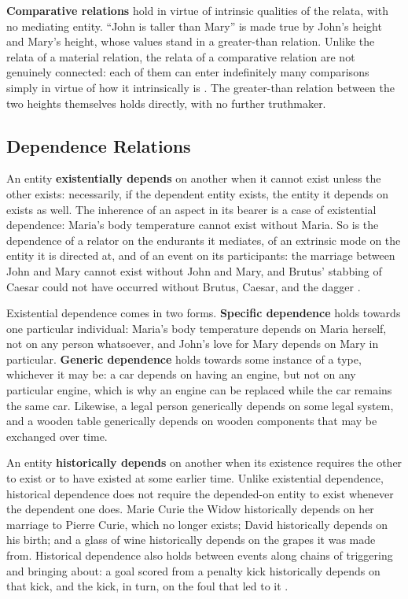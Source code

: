 \textbf{Comparative relations} hold in virtue of intrinsic qualities of the relata, with no mediating entity. ``John is taller than Mary'' is made true by John's height and Mary's height, whose values stand in a greater-than relation. Unlike the relata of a material relation, the relata of a comparative relation are not genuinely connected: each of them can enter indefinitely many comparisons simply in virtue of how it intrinsically is \cite{relations_in_ontology_driven_conceptual_modeling_2019}. The greater-than relation between the two heights themselves holds directly, with no further truthmaker.

\subsection{Dependence Relations}

An entity \textbf{existentially depends} on another when it cannot exist unless the other exists: necessarily, if the dependent entity exists, the entity it depends on exists as well. The inherence of an aspect in its bearer is a case of existential dependence: Maria's body temperature cannot exist without Maria. So is the dependence of a relator on the endurants it mediates, of an extrinsic mode on the entity it is directed at, and of an event on its participants: the marriage between John and Mary cannot exist without John and Mary, and Brutus' stabbing of Caesar could not have occurred without Brutus, Caesar, and the dagger \cite{ontological_foundations_for_structural_conceptual_models_2005}.

Existential dependence comes in two forms. \textbf{Specific dependence} holds towards one particular individual: Maria's body temperature depends on Maria herself, not on any person whatsoever, and John's love for Mary depends on Mary in particular. \textbf{Generic dependence} holds towards some instance of a type, whichever it may be: a car depends on having an engine, but not on any particular engine, which is why an engine can be replaced while the car remains the same car. Likewise, a legal person generically depends on some legal system, and a wooden table generically depends on wooden components that may be exchanged over time.

An entity \textbf{historically depends} on another when its existence requires the other to exist or to have existed at some earlier time. Unlike existential dependence, historical dependence does not require the depended-on entity to exist whenever the dependent one does. Marie Curie the Widow historically depends on her marriage to Pierre Curie, which no longer exists; David historically depends on his birth; and a glass of wine historically depends on the grapes it was made from. Historical dependence also holds between events along chains of triggering and bringing about: a goal scored from a penalty kick historically depends on that kick, and the kick, in turn, on the foul that led to it \cite{events_as_entities_in_ontology_driven_conceptual_modeling_2019}.

